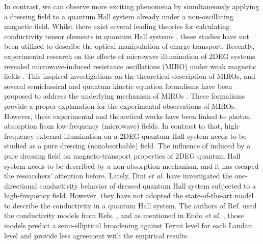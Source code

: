 \documentclass[
 reprint,
 amsmath,amssymb,
 aps,
 prb,
]{revtex4-2}
\begin{document}
In contrast, we can observe more exciting phenomena by simultaneously applying a dressing field to a quantum Hall system already under a non-oscillating magnetic field.
Whilst there exist several leading theories for calculating conductivity tensor elements in quantum Hall systems \cite{ando74_1,ando82,endo09}, these studies  have not been utilized to describe the optical manipulation of charge transport.
{\color{Red}
Recently, experimental research on the effects of microwave illumination of 2DEG systems revealed microwave-induced resistance oscillations (MIRO) under weak magnetic fields \cite{zudov01,mani02,zudov03,mani04}.
This inspired investigations on the theoretical description of MIROs, and several semiclassical and quantum kinetic equation formalisms have been proposed to address the underlying mechanism of MIROs \cite{durst03,dmitriev03,dmitriev05,dmitriev09}. These formalisms provide a proper explanation for the experimental observations of MIROs. However, these experimental and theoretical works have been linked to photon absorption from low-frequency (microwave) fields.
In contrast to that, high-frequency external illumination on a 2DEG quantum Hall system needs to be studied as a pure dressing (nonabsorbable) field.
The influence of induced by a pure dressing field on
magneto-transport properties of 2DEG quantum Hall system needs to be described by a non-absorption mechanism, and it has escaped the researchers’ attention before.
Lately, Dini \textit{et al.} \cite{dini16} have investigated the one-directional conductivity behavior of dressed quantum Hall system subjected to a high-frequency field.}
However, they have not adopted the state-of-the-art model to describe the conductivity in a quantum Hall system.
{\color{Red}
The authors of Ref. \cite{dini16} used the conductivity models from Refs. \cite{ando74_1,ando82}, and as mentioned in Endo \textit{et al.} \cite{endo09}, those models predict a semi-elliptical broadening against Fermi level for each Landau level and provide less agreement with the empirical results.}
\end{document}
